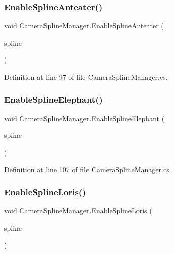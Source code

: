 \subsubsection{\texorpdfstring{Enable\+Spline\+Anteater()}{EnableSplineAnteater()}}
{\footnotesize\ttfamily void Camera\+Spline\+Manager.\+Enable\+Spline\+Anteater (\begin{DoxyParamCaption}\item[{\mbox{\hyperlink{class_camera_mover}{Camera\+Mover}}}]{spline }\end{DoxyParamCaption})}



Definition at line 97 of file Camera\+Spline\+Manager.\+cs.

\mbox{\label{class_camera_spline_manager_aa2bc822b023e64eb2143f801f8ca0d82}} 
\subsubsection{\texorpdfstring{Enable\+Spline\+Elephant()}{EnableSplineElephant()}}
{\footnotesize\ttfamily void Camera\+Spline\+Manager.\+Enable\+Spline\+Elephant (\begin{DoxyParamCaption}\item[{\mbox{\hyperlink{class_camera_mover}{Camera\+Mover}}}]{spline }\end{DoxyParamCaption})}



Definition at line 107 of file Camera\+Spline\+Manager.\+cs.

\mbox{\label{class_camera_spline_manager_aa1627d7fefa28da4c696265c46f32bb6}} 
\subsubsection{\texorpdfstring{Enable\+Spline\+Loris()}{EnableSplineLoris()}}
{\footnotesize\ttfamily void Camera\+Spline\+Manager.\+Enable\+Spline\+Loris (\begin{DoxyParamCaption}\item[{\mbox{\hyperlink{class_camera_mover}{Camera\+Mover}}}]{spline }\end{DoxyParamCaption})}



